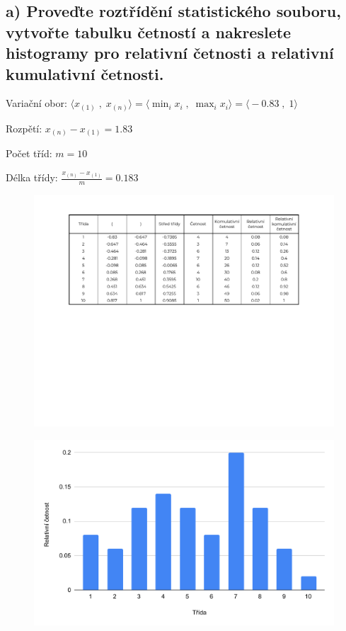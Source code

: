 \documentclass[11pt, a4paper, titlepage]{article}
\begin{document}
\noindent\makebox[\linewidth]{\rule{\paperwidth}{0.3pt}}


\subsection*{a) Proveďte roztřídění statistického souboru, vytvořte tabulku četností a nakreslete histogramy pro relativní četnosti a relativní kumulativní četnosti.}
\bigskip

Variační obor: ${\displaystyle \big\langle x_{(1)} \;,\; x_{(n)} \big\rangle = \big\langle \min_{i} x_i \;,\; \max_{i} x_i \big\rangle = \big\langle -0.83 \;,\; 1 \big\rangle}$
\bigskip

Rozpětí: ${\displaystyle x_{(n)} - x_{(1)} = 1.83}$
\bigskip

Počet tříd: ${\displaystyle m = 10}$
\bigskip

Délka třídy: ${\displaystyle \frac{x_{(n)} - x_{(1)}}{m} = 0.183}$


\begin{figure}[H]
    \centering
    \includegraphics[width=.99\linewidth]{images/1-a-1-crop.pdf}
\end{figure}

\begin{figure}[H]
    \centering
    \includegraphics[width=.75\linewidth]{images/1-a-2.pdf}
\end{figure}
\end{document}
